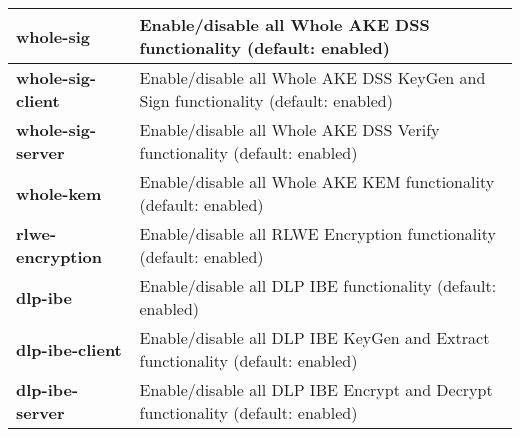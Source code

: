 \begin{table}[h]
\begin{tabularx}{\textwidth}{l p{13cm}}
\midrule
\textbf{whole-sig} &Enable/disable all Whole AKE DSS functionality (default: enabled) \\
\midrule
\textbf{whole-sig-client} &Enable/disable all Whole AKE DSS KeyGen and Sign functionality (default: enabled) \\
\midrule
\textbf{whole-sig-server} &Enable/disable all Whole AKE DSS Verify functionality (default: enabled) \\
\midrule
\textbf{whole-kem} &Enable/disable all Whole AKE KEM functionality (default: enabled) \\
\midrule
\textbf{rlwe-encryption} &Enable/disable all RLWE Encryption functionality (default: enabled) \\
\midrule
\textbf{dlp-ibe} &Enable/disable all DLP IBE functionality (default: enabled) \\
\midrule
\textbf{dlp-ibe-client} &Enable/disable all DLP IBE KeyGen and Extract functionality (default: enabled) \\
\midrule
\textbf{dlp-ibe-server} &Enable/disable all DLP IBE Encrypt and Decrypt functionality (default: enabled) \\
\bottomrule
\end{tabularx}
\end{table}

